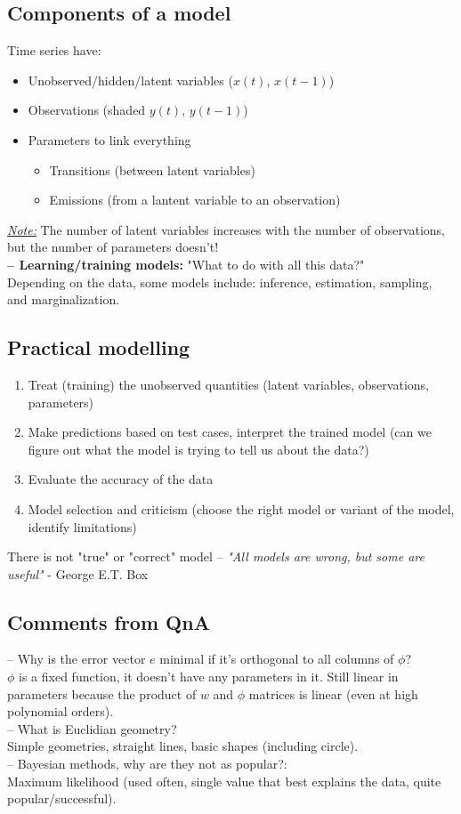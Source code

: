 \documentclass[a4paper,11pt]{article}
\begin{document}
	\subsection{Components of a model}
	Time series have: 
	\begin{itemize}
		\item Unobserved/hidden/latent variables ($x(t)$, $x(t-1)$)
		\item Observations (shaded $y(t)$, $y(t-1)$)
		\item Parameters to link everything 
		\begin{itemize}
			\item Transitions (between latent variables)
			\item Emissions (from a lantent variable to an observation)
		\end{itemize}
	\end{itemize}
	\underline{\emph{Note:}} The number of latent variables increases with the number of observations, but the number of parameters doesn't!\\
	\textbf{-- Learning/training models:} "What to do with all this data?"\\ Depending on the data, some models include: inference, estimation, sampling, and marginalization.
	\subsection{Practical modelling}
	\begin{enumerate}
		\item Treat (training) the unobserved quantities (latent variables, observations, parameters)
		\item Make predictions based on test cases, interpret the trained model (can we figure out what the model is trying to tell us about the data?)
		\item Evaluate the accuracy of the data
		\item Model selection and criticism (choose the right model or variant of the model, identify limitations)
	\end{enumerate}
	There is not "true" or "correct" model -- \emph{"All models are wrong, but some are useful"} - George E.T. Box
	\subsection{Comments from QnA}
	-- Why is the error vector $e$ minimal if it's orthogonal to all columns of $\phi$?\\
	$\phi$ is a fixed function, it doesn't have any parameters in it. Still linear in parameters because the product of $w$ and $\phi$ matrices is linear (even at high polynomial orders).\\
	-- What is Euclidian geometry?\\
	Simple geometries, straight lines, basic shapes (including circle).\\
	-- Bayesian methods, why are they not as popular?: \\
	Maximum likelihood (used often, single value that best explains the data, quite popular/successful).
\end{document}
